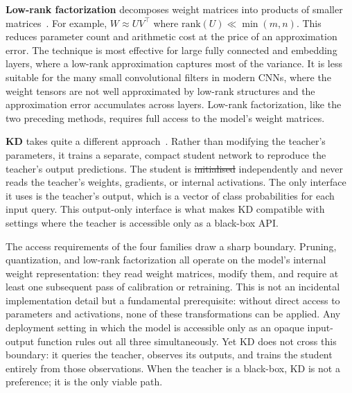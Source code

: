 \documentclass[12pt, a4paper, twoside]{book}
\makeatletter
\numberwithin{equation}{chapter}
\theoremstyle{plain}
\theoremstyle{definition}
\theoremstyle{remark}
\newenvironment{foldable}{}{}
\providecommand{\DIFaddtex}[1]{{\protect\color{blue}\uwave{#1}}} %
\providecommand{\DIFdeltex}[1]{{\protect\color{red}\sout{#1}}} %
\providecommand{\DIFaddbegin}{} %
\providecommand{\DIFaddend}{} %
\providecommand{\DIFdelbegin}{} %
\providecommand{\DIFdelend}{} %
\providecommand{\DIFadd}[1]{\texorpdfstring{\DIFaddtex{#1}}{#1}} %
\providecommand{\DIFdel}[1]{\texorpdfstring{\DIFdeltex{#1}}{}} %
\newcommand{\DIFscaledelfig}{0.5}
\newlength{\DIFdelgraphicswidth} %
\newlength{\DIFdelgraphicsheight} %
\newcommand{\DIFaddincludegraphics}[2][]{{\color{blue}\fbox{\DIFOincludegraphics[#1]{#2}}}} %
\newcommand{\DIFdelincludegraphics}[2][]{%
\sbox{\DIFdelgraphicsbox}{\DIFOincludegraphics[#1]{#2}}%
\settoboxwidth{\DIFdelgraphicswidth}{\DIFdelgraphicsbox} %
\settoboxtotalheight{\DIFdelgraphicsheight}{\DIFdelgraphicsbox} %
\scalebox{\DIFscaledelfig}{%
\parbox[b]{\DIFdelgraphicswidth}{\usebox{\DIFdelgraphicsbox}\\[-\baselineskip] \rule{\DIFdelgraphicswidth}{0em}}\llap{\resizebox{\DIFdelgraphicswidth}{\DIFdelgraphicsheight}{%
\setlength{\unitlength}{\DIFdelgraphicswidth}%
\begin{picture}(1,1)%
\thicklines\linethickness{2pt} %
{\color[rgb]{1,0,0}\put(0,0){\framebox(1,1){}}}%
{\color[rgb]{1,0,0}\put(0,0){\line( 1,1){1}}}%
{\color[rgb]{1,0,0}\put(0,1){\line(1,-1){1}}}%
\end{picture}%
}\hspace*{3pt}}} %
} %
\DeclareRobustCommand{\DIFaddbegin}{\DIFOaddbegin \let\includegraphics\DIFaddincludegraphics} %
\DeclareRobustCommand{\DIFaddend}{\DIFOaddend \let\includegraphics\DIFOincludegraphics} %
\DeclareRobustCommand{\DIFdelbegin}{\DIFOdelbegin \let\includegraphics\DIFdelincludegraphics} %
\DeclareRobustCommand{\DIFdelend}{\DIFOaddend \let\includegraphics\DIFOincludegraphics} %
\let\sout@orig\sout %
\renewcommand{\sout}[1]{\ifmmode\text{\sout@orig{\ensuremath{#1}}}\else\sout@orig{#1}\fi} %
\makeatother
\begin{document}
\begin{foldable}
  \textbf{Low-rank factorization} decomposes weight matrices into products of smaller matrices~\cite{hu2022lora}.
  For example, $W \approx UV^{\top}$ where $\text{rank}(U) \ll \min(m,n)$.
  This reduces parameter count and arithmetic cost at the price of an approximation error.
  The technique is most effective for large fully connected and embedding layers, where a low-rank approximation captures most of the variance.
  It is less suitable for the many small convolutional filters in modern CNNs, where the weight tensors are not well approximated by low-rank structures and the approximation error accumulates across layers.
  Low-rank factorization, like the two preceding methods, requires full access to the model's weight matrices.
\end{foldable}

\begin{foldable}
  \textbf{\Acl{KD}} takes quite a different approach~\cite{hinton2015distilling}.
  Rather than modifying the teacher's parameters, it trains a separate, compact student network to reproduce the teacher's output predictions.
  The student is \DIFdelbegin \DIFdel{initialised }\DIFdelend \DIFaddbegin \DIFadd{initialized }\DIFaddend independently and never reads the teacher's weights, gradients, or internal activations.
  The only interface it uses is the teacher's output, which is a vector of class probabilities for each input query.
  This output-only interface is what makes \ac{KD} compatible with settings where the teacher is accessible only as a black-box \ac{API}.
\end{foldable}

\begin{foldable}
  The access requirements of the four families draw a sharp boundary.
  Pruning, quantization, and low-rank factorization all operate on the model's internal weight representation: they read weight matrices, modify them, and require at least one subsequent pass of calibration or retraining.
  This is not an incidental implementation detail but a fundamental prerequisite: without direct access to parameters and activations, none of these transformations can be applied.
  Any deployment setting in which the model is accessible only as an opaque input-output function rules out all three simultaneously.
  Yet \ac{KD} does not cross this boundary: it queries the teacher, observes its outputs, and trains the student entirely from those observations.
  When the teacher is a black-box, \ac{KD} is not a preference; it is the only viable path.
\end{foldable}
\end{document}
